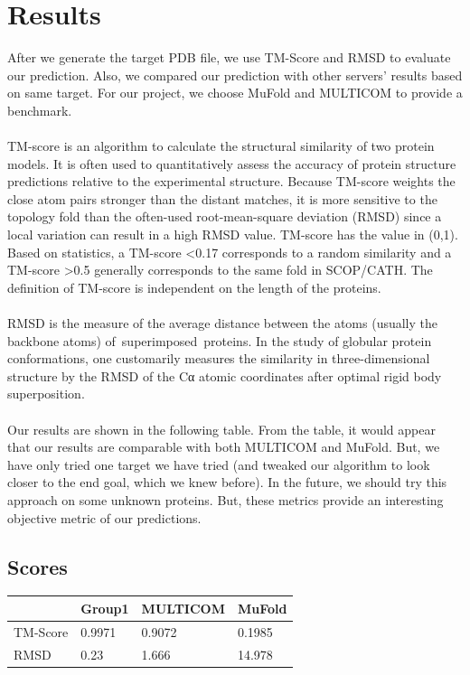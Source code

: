 \documentclass{article}
\begin{document}
\section{Results}

After we generate the target PDB file, we use TM-Score and RMSD to evaluate our prediction. Also, we compared our prediction with other servers’ results based on same target. For our project, we choose MuFold and MULTICOM to provide a benchmark.\\\\
TM-score is an algorithm to calculate the structural similarity of two protein models. It is often used to quantitatively assess the accuracy of protein structure predictions relative to the experimental structure. Because TM-score weights the close atom pairs stronger than the distant matches, it is more sensitive to the topology fold than the often-used root-mean-square deviation (RMSD) since a local variation can result in a high RMSD value. TM-score has the value in (0,1). Based on statistics, a TM-score \textless0.17 corresponds to a random similarity and a TM-score \textgreater0.5 generally corresponds to the same fold in SCOP/CATH. The definition of TM-score is independent on the length of the proteins.\\\\
RMSD is the measure of the average distance between the atoms (usually the backbone atoms) of superimposed proteins. In the study of globular protein conformations, one customarily measures the similarity in three-dimensional structure by the RMSD of the Cα atomic coordinates after optimal rigid body superposition.\\\\
Our results are shown in the following table. From the table, it would appear that our results are comparable with both MULTICOM and MuFold. But, we have only tried one target we have tried (and tweaked our algorithm to look closer to the end goal, which we knew before). In the future, we should try this approach on some unknown proteins.  But, these metrics provide an interesting objective metric of our predictions.

\subsection{Scores}
\begin{center}
    \begin{tabular}{ | l | l | l | p{2cm} |}
    \hline
      & Group1 & MULTICOM & MuFold \\ \hline
    TM-Score & 0.9971 & 0.9072 & 0.1985 \\ \hline
    RMSD & 0.23 & 1.666 & 14.978 \\
    \hline
    \end{tabular}
\end{center}
\end{document}
